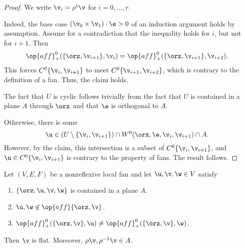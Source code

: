\begin{proof} 
We write $\v_i = \rho^i \v$ for $i=0,\ldots,r$.

Indeed, the base case $(\v_0\times \v_1)\cdot \e > 0$ of an induction
argument holds by assumption.  Assume for a contradiction that the
inequality holds for $i$, but not for $i+1$.  Then
\[ 
  \op{aff}^0_+(\{\orz,\v_{i+1}\},\v_i) 
= \op{aff}^0_+(\{\orz,\v_{i+1}\},\v_{i+2}).
\]  
This forces $C^0\{\v_i,\v_{i+1}\}$ to meet $C^0\{\v_{i+1},\v_{i+2}\}$,
which is contrary to the definition of a fan.  Thus, the claim holds.

The fact that $U$ is cyclic follows trivially from the fact that $U$
is contained in a plane $A$ through $\orz$ and that $\e$ is orthogonal
to $A$.

Otherwise, there is some 
\[ 
  \u \in (U\setminus \{\v_i,\v_{i+1}\}) 
\cap W^0(\orz,\e,\v_i,\v_{i+1}) \cap A.
\] 
However, by the claim, this intersection is a subset of $C^0\{\v_i,\v_{i+1}\}$, and
$\u\in C^0\{\v_i,\v_{i+1}\}$ is contrary to the property
 of fans.  The result follows.
\end{proof}

\begin{lemma}[] \label{lemma:A}  
Let $(V,E,F)$ be a nonreflexive local fan and let
  $\u,\v,\w\in V$ satisfy
\begin{enumerate}\wasitemize 
\item $\{\orz,\u,\v,\w\}$ is contained in a plane $A$. \vspace{3pt}
\item $\u,\w\not\in\op{aff}\{\orz,\v\}$. \vspace{3pt}
\item $\op{aff}^0_+(\{\orz,\v\},\u) \ne \op{aff}^0_+(\{\orz,\v\},\w)$.
\end{enumerate}\wasitemize 
Then $\v$ is flat.  Moreover, $\rho \v,\rho^{-1} \v\in A$.
\end{lemma}

